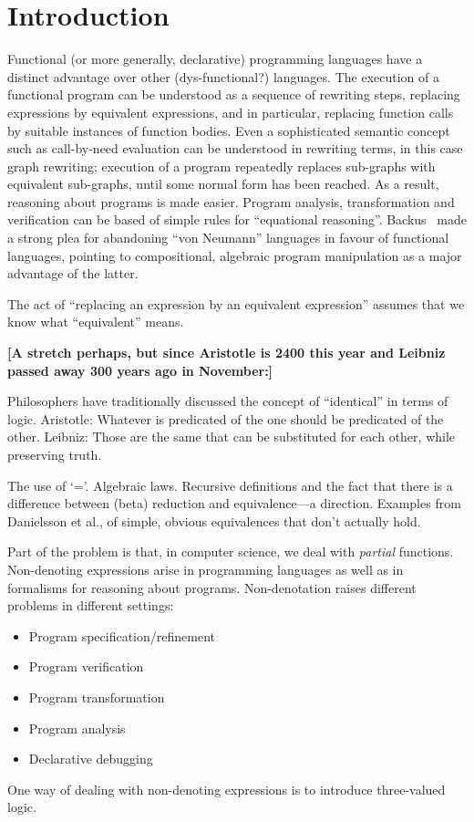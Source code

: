 \documentclass{llncs}
\begin{document}
\section{Introduction}

Functional (or more generally, declarative) programming languages 
have a distinct advantage over other (dys-functional?) languages.
The execution of a functional program can be understood as a 
sequence of rewriting steps, replacing expressions by equivalent
expressions, and in particular, replacing function calls by
suitable instances of function bodies.
Even a sophisticated semantic concept such as call-by-need evaluation
can be understood in rewriting terms, in this case graph rewriting;
execution of a program repeatedly replaces sub-graphs with equivalent
sub-graphs, until some normal form has been reached.
As a result, reasoning about programs is made easier.
Program analysis, transformation and verification can be based
of simple rules for ``equational reasoning''.
Backus~\cite{xxx} made a strong plea for abandoning ``von Neumann''
languages in favour of functional languages,
pointing to compositional, algebraic program manipulation as a major 
advantage of the latter.

The act of 
``replacing an expression by an equivalent expression''
assumes that we know what ``equivalent'' means.

\textbf{%
[A stretch perhaps, but since Aristotle is 2400 this year and 
Leibniz passed away 300 years ago in November:]}

Philosophers have traditionally discussed the concept of ``identical''
in terms of logic.
Aristotle: 
Whatever is predicated of the one should be predicated of the other.
Leibniz: Those are the same that can be substituted for each other,
while preserving truth.

The use of `='.
Algebraic laws.
Recursive definitions and the fact that there is a difference between
(beta) reduction and equivalence---a direction.
Examples from Danielsson et al., of simple, obvious equivalences that 
don't actually hold.

Part of the problem is that, in computer science, 
we deal with \emph{partial} functions.
Non-denoting expressions arise in programming
languages as well as in formalisms for reasoning about programs.
Non-denotation raises different problems in different settings:
\begin{itemize}
\item
Program specification/refinement
\item
Program verification
\item
Program transformation
\item
Program analysis
\item
Declarative debugging
\end{itemize}
One way of dealing with non-denoting expressions is to introduce
three-valued logic.
\end{document}
